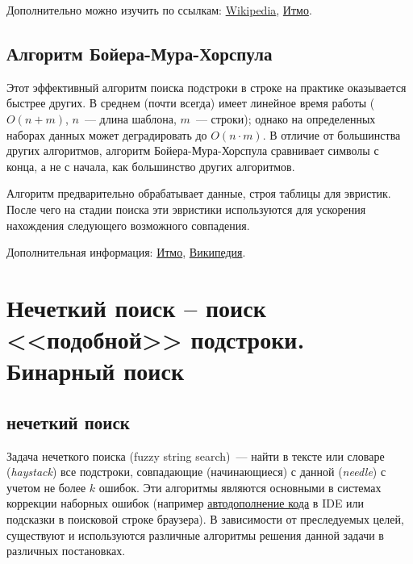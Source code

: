 Дополнительно можно изучить по ссылкам: \href{https://en.wikipedia.org/wiki/Knuth\%E2\%80\%93Morris\%E2\%80\%93Pratt_algorithm}{Wikipedia},
\href{https://neerc.ifmo.ru/wiki/index.php?title=\%D0\%90\%D0\%BB\%D0\%B3\%D0\%BE\%D1\%80\%D0\%B8\%D1\%82\%D0\%BC\_\%D0\%9A\%D0\%BD\%D1\%83\%D1\%82\%D0\%B0-\%D0\%9C\%D0\%BE\%D1\%80\%D1\%80\%D0\%B8\%D1\%81\%D0\%B0-\%D0\%9F\%D1\%80\%D0\%B0\%D1\%82\%D1\%82\%D0\%B0}{Итмо}.

\subsection{Алгоритм Бойера-Мура-Хорспула}
Этот эффективный алгоритм поиска подстроки в строке на практике оказывается быстрее других. В среднем (почти всегда) имеет линейное
время работы (\(O(n + m)\), \(n\)~--- длина шаблона, \(m\)~--- строки); однако на определенных наборах данных
может деградировать до \(O(n\cdot m)\). В отличие от большинства других алгоритмов, алгоритм Бойера-Мура-Хорспула сравнивает
символы с конца, а не с начала, как большинство других алгоритмов.

Алгоритм предварительно обрабатывает данные, строя таблицы для эвристик. После чего на стадии поиска эти эвристики используются
для ускорения нахождения следующего возможного совпадения.

Дополнительная информация: \href{https://neerc.ifmo.ru/wiki/index.php?title=Алгоритм_Бойера-Мура}{Итмо},
\href{https://ru.wikipedia.org/wiki/Алгоритм_Бойера_—_Мура_—_Хорспула}{Википедия}.

%
%

\section{Нечеткий поиск – поиск <<подобной>> подстроки. Бинарный поиск}

\subsection{нечеткий поиск}
Задача нечеткого поиска (fuzzy string search)~--- найти в тексте или словаре (\textit{haystack}) все подстроки, совпадающие
(начинающиеся) с данной (\textit{needle}) с учетом не более \(k\) ошибок.
Эти алгоритмы являются основными в системах коррекции наборных ошибок
(например \href{https://en.wikipedia.org/wiki/Code_completion}{автодополнение кода} в IDE или подсказки в поисковой строке браузера).
В зависимости от преследуемых целей, существуют и используются различные алгоритмы решения данной задачи в различных постановках.

